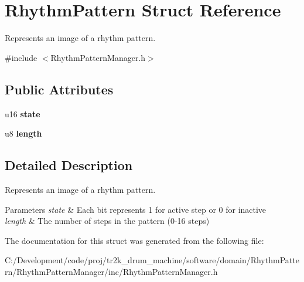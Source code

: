 \hypertarget{struct_rhythm_pattern}{}\section{Rhythm\+Pattern Struct Reference}
\label{struct_rhythm_pattern}


Represents an image of a rhythm pattern.  




{\ttfamily \#include $<$Rhythm\+Pattern\+Manager.\+h$>$}

\subsection*{Public Attributes}
\begin{DoxyCompactItemize}
\item 
\mbox{\label{struct_rhythm_pattern_a7a05f0956028bcd1af32561747dae545}} 
u16 {\bfseries state}
\item 
\mbox{\label{struct_rhythm_pattern_ac2a7271e20a679abbc5cbf9246517788}} 
u8 {\bfseries length}
\end{DoxyCompactItemize}


\subsection{Detailed Description}
Represents an image of a rhythm pattern. 


\begin{DoxyParams}{Parameters}
{\em state} & Each bit represents 1 for active step or 0 for inactive \\
\hline
{\em length} & The number of steps in the pattern (0-\/16 steps) \\
\hline
\end{DoxyParams}


The documentation for this struct was generated from the following file\+:\begin{DoxyCompactItemize}
\item 
C\+:/\+Development/code/proj/tr2k\+\_\+drum\+\_\+machine/software/domain/\+Rhythm\+Pattern/\+Rhythm\+Pattern\+Manager/inc/Rhythm\+Pattern\+Manager.\+h\end{DoxyCompactItemize}
